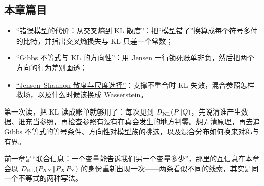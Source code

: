 \subsection{本章篇目}

\begin{itemize}
\tightlist
\item \hyperref[sec:07-Information-Theory/03-Divergences/01]{``错误模型的代价：从交叉熵到 KL 散度''}：把``模型错了''换算成每个符号多付的比特，并指出交叉熵损失与 KL 只差一个常数；
\item \hyperref[sec:07-Information-Theory/03-Divergences/02]{``Gibbs 不等式与 KL 的方向性''}：用 Jensen 一行锁死账单非负，然后把两个方向的行为差别画透；
\item \hyperref[sec:07-Information-Theory/03-Divergences/03]{``Jensen--Shannon 散度与尺度选择''}：支撑不重合时 KL 失效，混合参照怎样救场，以及什么时候该换成 Wasserstein。
\end{itemize}

第一次读，把 KL 读成账单就够用了：每次见到 \(D_{\mathrm{KL}}(P\|Q)\)，先说清谁产生数据、谁充当参照，再检查参照有没有在真会发生的地方判零。想弄清原理，再去追 Gibbs 不等式的等号条件、方向性对模型族的挑选，以及混合分布如何换来对称与有界。

前一章是\hyperref[ch:055]{``联合信息：一个变量能告诉我们另一个变量多少''}，那里的互信息在本章会以 \(D_{\mathrm{KL}}(P_{XY}\|P_XP_Y)\) 的身份重新出现一次——两条看似不同的线索，其实是同一个不等式的两种写法。
